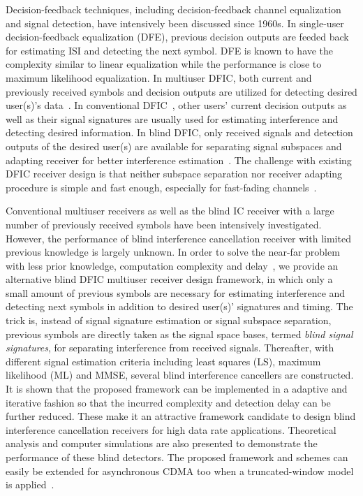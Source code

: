 \documentclass[conference]{IEEEtran}
\begin{document}
Decision-feedback techniques, including decision-feedback channel
equalization and signal detection, have intensively been discussed
since 1960s. In single-user decision-feedback equalization (DFE),
previous decision outputs are feeded back for estimating ISI and
detecting the next symbol. DFE is known to have the complexity
similar to linear equalization while the performance is close to
maximum likelihood equalization. In multiuser DFIC, both current
and previously received symbols and decision outputs are utilized
for detecting desired user(s)'s data~\cite{Verd98}. In
conventional DFIC~\cite{Verd98}, other users' current decision
outputs as well as their signal signatures are usually used for
estimating interference and detecting desired information. In
blind DFIC, only received signals and detection outputs of the
desired user(s) are available for separating signal subspaces and
adapting receiver for better interference
estimation~\cite{Wang98}. The challenge with existing DFIC
receiver design is that neither subspace separation nor receiver
adapting procedure is simple and fast enough, especially for
fast-fading channels~\cite{Madh94,Wang98,Zhang02}.

Conventional multiuser receivers as well as the blind IC receiver
with a large number of previously received symbols have been
intensively investigated. However, the performance of blind
interference cancellation receiver with limited previous knowledge
is largely unknown. In order to solve the near-far problem with
less prior knowledge, computation complexity and
delay~\cite{Wang03d,Wang05A}, we provide an alternative blind DFIC
multiuser receiver design framework, in which only a small amount
of previous symbols are necessary for estimating interference and
detecting next symbols in addition to desired user(s)' signatures
and timing. The trick is, instead of signal signature estimation
or signal subspace separation, previous symbols are directly taken
as the signal space bases, termed {\em blind signal signatures},
for separating interference from received signals. Thereafter,
with different signal estimation criteria including least squares
(LS), maximum likelihood (ML) and MMSE, several blind interference
cancellers are constructed. It is shown that the proposed
framework can be implemented in a adaptive and iterative fashion
so that the incurred complexity and detection delay can be further
reduced. These make it an attractive framework candidate to design
blind interference cancellation receivers for high data rate
applications. Theoretical analysis and computer simulations are
also presented to demonstrate the performance of these blind
detectors. The proposed framework and schemes can easily be
extended for asynchronous CDMA too when a truncated-window model
is applied~\cite{Verd98}.
\end{document}
